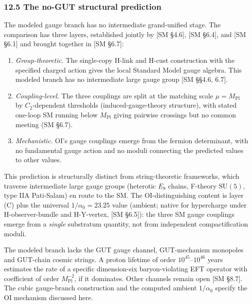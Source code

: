 \documentclass[
]{article}
\begin{document}
\hypertarget{the-no-gut-structural-prediction}{%
\subsubsection{12.5 The no-GUT structural
prediction}\label{the-no-gut-structural-prediction}}

The modeled gauge branch has no intermediate grand-unified stage. The
comparison has three layers, established jointly by {[}SM §4.6{]}, {[}SM
§6.4{]}, and {[}SM §6.1{]} and brought together in {[}SM §6.7{]}:

\begin{enumerate}
\def\labelenumi{(\Alph{enumi})}
\item
  \emph{Group-theoretic.} The single-copy H-link and H-cust construction
  with the specified charged action gives the local Standard Model gauge
  algebra. This modeled branch has no intermediate large gauge group
  {[}SM §§4.6, 6.7{]}.
\item
  \emph{Coupling-level.} The three couplings are split at the matching
  scale \(\mu = M_{\mathrm{Pl}}\) by \(C_2\)-dependent thresholds
  (induced-gauge-theory structure), with stated one-loop SM running
  below \(M_{\mathrm{Pl}}\) giving pairwise crossings but no common
  meeting (SM §6.7).
\item
  \emph{Mechanistic.} OI's gauge couplings emerge from the fermion
  determinant, with no fundamental gauge action and no moduli connecting
  the predicted values to other values.
\end{enumerate}

This prediction is structurally distinct from string-theoretic
frameworks, which traverse intermediate large gauge groups (heterotic
\(E_8\) chains, F-theory \(\mathrm{SU}(5)\), type IIA Pati-Salam) en
route to the SM. The OI-distinguishing content is layer (C) plus the
universal \(1/\alpha_0 = 23.25\) value (ambient; native for hypercharge
under H-observer-bundle and H-Y-vertex, {[}SM §6.5{]}): the three SM
gauge couplings emerge from a \emph{single} substratum quantity, not
from independent compactification moduli.

The modeled branch lacks the GUT gauge channel, GUT-mechanism monopoles
and GUT-chain cosmic strings. A proton lifetime of order
\(10^{45}\)--\(10^{46}\) years estimates the rate of a specific
dimension-six baryon-violating EFT operator with coefficient of order
\(M_{\mathrm{Pl}}^{-2}\), if it dominates. Other channels remain open
{[}SM §8.7{]}. The cubic gauge-branch construction and the computed
ambient \(1/\alpha_0\) specify the OI mechanism discussed here.
\end{document}
